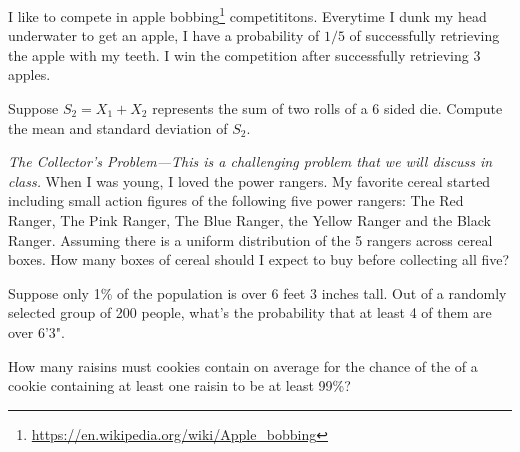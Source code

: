 \documentclass[addpoints,12pt]{exam}
\begin{document}
\begin{questions}
\question[4] I like to compete in apple bobbing\footnote{\url{https://en.wikipedia.org/wiki/Apple_bobbing}} competititons. Everytime I dunk my head underwater to get an apple, I have a probability of $1/5$ of successfully retrieving the apple with my teeth. I win the competition after successfully retrieving 3 apples. 

 \noaddpoints
{}
\addpoints

\question[2] Suppose $S_2=X_1 + X_2$ represents the sum of two rolls of a 6 sided die. Compute the mean and standard deviation of $S_2$.

\vspace{1.3in}

\newpage
\question[3] \emph{The Collector's Problem---This is a challenging problem that we will discuss in class.}
When I was young, I loved the power rangers. My favorite cereal started including small action figures of the following five power rangers: The Red Ranger, The Pink Ranger, The Blue Ranger, the Yellow Ranger and the Black Ranger. Assuming there is a uniform distribution of the 5 rangers across cereal boxes. How many boxes of cereal should I expect to buy before collecting all five?

\vspace{3in}



\question[2] Suppose only 1\% of the population is over 6 feet 3 inches tall. Out of a randomly selected group of 200 people, what's the probability that at least 4 of them are over 6'3".

\vspace{1.5in}

\question[2] How many raisins must cookies contain on average for the chance of the of a cookie containing at least one raisin to be at least 99\%?



\end{questions}
\end{document}
